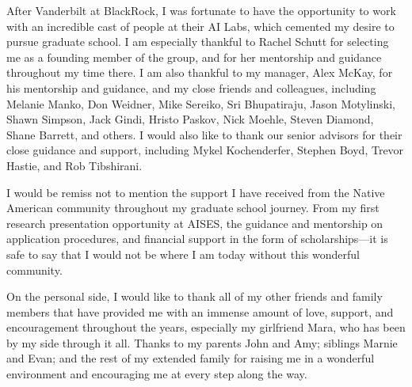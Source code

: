 \begin{acknowledgments}
    After Vanderbilt at BlackRock, I was fortunate to have the opportunity to work with an incredible cast of people at their AI Labs, which cemented my desire to pursue graduate school. I am especially thankful to Rachel Schutt for selecting me as a founding member of the group, and for her mentorship and guidance throughout my time there. I am also thankful to my manager, Alex McKay, for his mentorship and guidance, and my close friends and colleagues, including
    Melanie Manko,
    Don Weidner,
    Mike Sereiko,
    Sri Bhupatiraju,
    Jason Motylinski,
    Shawn Simpson,
    Jack Gindi,
    Hristo Paskov,
    Nick Moehle,
    Steven Diamond,
    Shane Barrett,
    and others.
    I would also like to thank our senior advisors for their close guidance and support, including
    Mykel Kochenderfer,
    Stephen Boyd,
    Trevor Hastie,
    and Rob Tibshirani.

    I would be remiss not to mention the support I have received from the Native American community throughout my graduate school journey. From my first research presentation opportunity at AISES, the guidance and mentorship on application procedures, and financial support in the form of scholarships---it is safe to say that I would not be where I am today without this wonderful community.

    On the personal side, I would like to thank all of my other friends and family members that have provided me with an immense amount of love, support, and encouragement throughout the years,
    especially my girlfriend Mara, who has been by my side through it all.
    Thanks to my parents John and Amy;
    siblings Marnie and Evan;
    and the rest of my extended family
    for raising me in a wonderful environment and
    encouraging me at every step along the way.
\end{acknowledgments}
